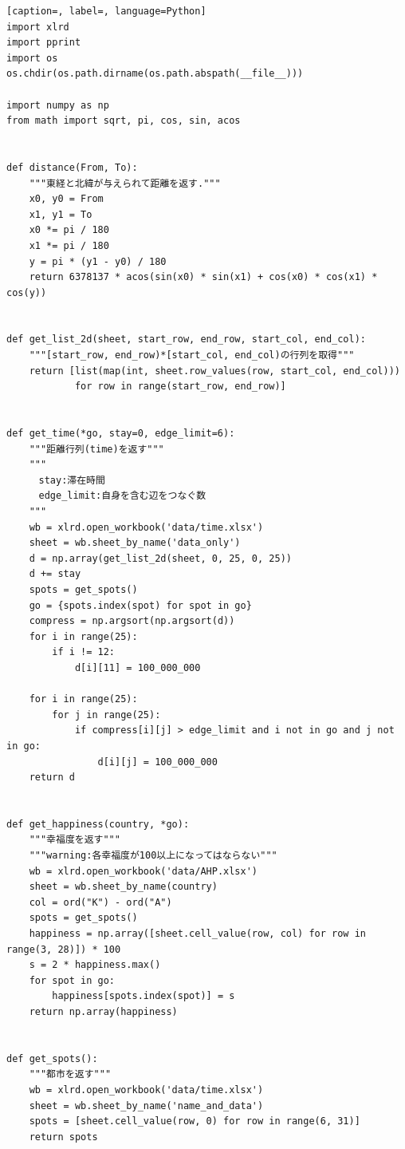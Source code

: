\documentclass[a4paper,12pt]{jsreport}
\theoremstyle{definition}
\begin{document}
\begin{lstlisting}[caption=, label=, language=Python]
import xlrd
import pprint
import os
os.chdir(os.path.dirname(os.path.abspath(__file__)))

import numpy as np
from math import sqrt, pi, cos, sin, acos


def distance(From, To):
    """東経と北緯が与えられて距離を返す."""
    x0, y0 = From
    x1, y1 = To
    x0 *= pi / 180
    x1 *= pi / 180
    y = pi * (y1 - y0) / 180
    return 6378137 * acos(sin(x0) * sin(x1) + cos(x0) * cos(x1) * cos(y))


def get_list_2d(sheet, start_row, end_row, start_col, end_col):
    """[start_row, end_row)*[start_col, end_col)の行列を取得"""
    return [list(map(int, sheet.row_values(row, start_col, end_col)))
            for row in range(start_row, end_row)]


def get_time(*go, stay=0, edge_limit=6):
    """距離行列(time)を返す"""
    """
    　stay:滞在時間
    　edge_limit:自身を含む辺をつなぐ数
    """
    wb = xlrd.open_workbook('data/time.xlsx')
    sheet = wb.sheet_by_name('data_only')
    d = np.array(get_list_2d(sheet, 0, 25, 0, 25))
    d += stay
    spots = get_spots()
    go = {spots.index(spot) for spot in go}
    compress = np.argsort(np.argsort(d))
    for i in range(25):
        if i != 12:
            d[i][11] = 100_000_000

    for i in range(25):
        for j in range(25):
            if compress[i][j] > edge_limit and i not in go and j not in go:
                d[i][j] = 100_000_000
    return d


def get_happiness(country, *go):
    """幸福度を返す"""
    """warning:各幸福度が100以上になってはならない"""
    wb = xlrd.open_workbook('data/AHP.xlsx')
    sheet = wb.sheet_by_name(country)
    col = ord("K") - ord("A")
    spots = get_spots()
    happiness = np.array([sheet.cell_value(row, col) for row in range(3, 28)]) * 100
    s = 2 * happiness.max()
    for spot in go:
        happiness[spots.index(spot)] = s
    return np.array(happiness)


def get_spots():
    """都市を返す"""
    wb = xlrd.open_workbook('data/time.xlsx')
    sheet = wb.sheet_by_name('name_and_data')
    spots = [sheet.cell_value(row, 0) for row in range(6, 31)]
    return spots



\end{lstlisting}
\end{document}
